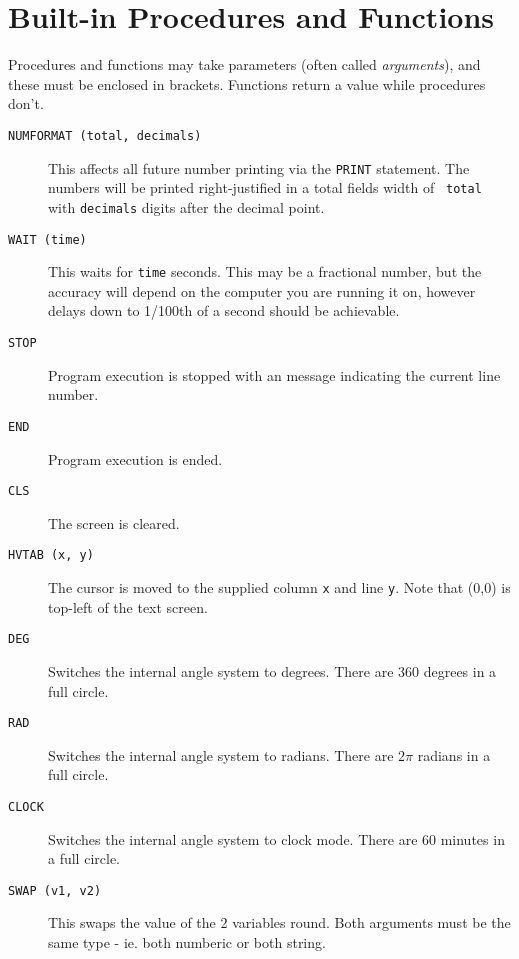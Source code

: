 \chapter{Built-in Procedures and Functions}

Procedures and functions may take parameters (often called {\em
arguments}), and these must be enclosed in brackets.
Functions return a value while procedures don't.

\begin{description}
\item[{\tt NUMFORMAT (total, decimals)}]
This affects all future number printing via the {\tt PRINT} statement. The
numbers will be printed right-justified in a total fields width of {\tt
total} with {\tt decimals} digits after the decimal point.
\item[{\tt WAIT (time)}]
This waits for {\tt time} seconds. This may be a fractional number,
but the accuracy will depend on the computer you are running it on,
however delays down to 1/100th of a second should be achievable.
\item[{\tt STOP}]
Program execution is stopped with an message indicating the current
line number.
\item[{\tt END}]
Program execution is ended.
\item[{\tt CLS}]
The screen is cleared.
\item[{\tt HVTAB (x, y)}]
The cursor is moved to the supplied column {\tt x} and line {\tt y}. Note
that (0,0) is top-left of the text screen.
\item[{\tt DEG}]
Switches the internal angle system to degrees. There are 360 degrees in
a full circle.
\item[{\tt RAD}]
Switches the internal angle system to radians. There are $2\pi$ radians
in a full circle.
\item[{\tt CLOCK}]
Switches the internal angle system to clock mode. There are 60 minutes
in a full circle.
\item[{\tt SWAP (v1, v2)}]
This swaps the value of the 2 variables round. Both arguments must be
the same type - ie.  both numberic or both string.
\end{description}
